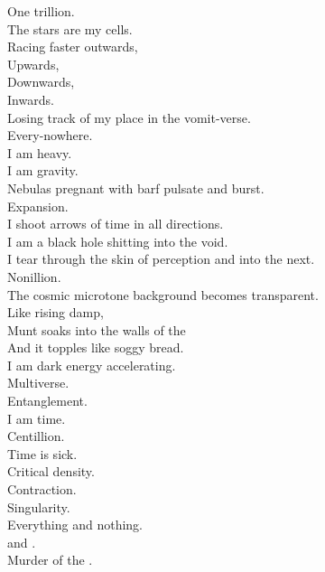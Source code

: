 One trillion. \\
The stars are my cells. \\
Racing faster outwards, \\
Upwards, \\
Downwards, \\
Inwards. \\
Losing track of my place in the vomit-verse. \\
Every-nowhere. \\

I am heavy. \\
I am gravity. \\
Nebulas pregnant with barf pulsate and burst. \\
Expansion. \\
I shoot arrows of time in all directions. \\
I am a black hole shitting into the void. \\
I tear through the skin of perception and into the next. \\

Nonillion. \\
The cosmic microtone background becomes transparent. \\
Like rising damp, \\
Munt soaks into the walls of the  \\
And it topples like soggy bread. \\
I am dark energy accelerating. \\
Multiverse. \\

Entanglement. \\
I am time. \\
Centillion. \\
Time is sick. \\
Critical density. \\
Contraction. \\
Singularity. \\
Everything and nothing. \\
 and . \\

Murder of the . \\
